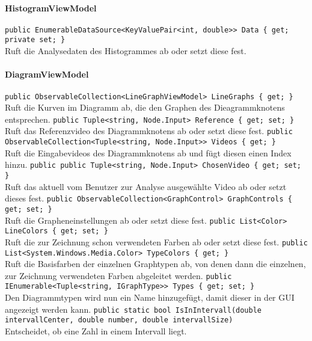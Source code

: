 \paragraph{HistogramViewModel}
\begin{itemize}
	\add \verb!public EnumerableDataSource<KeyValuePair<int, double>> Data { get; private set; }! \\
	Ruft die Analysedaten des Histogrammes ab oder setzt diese fest.
\end{itemize}

\paragraph{DiagramViewModel}
\begin{itemize}
	\add \verb!public ObservableCollection<LineGraphViewModel> LineGraphs { get; }! \\
	Ruft die Kurven im Diagramm ab, die den Graphen des Dieagrammknotens entsprechen. 
	\add \verb!public Tuple<string, Node.Input> Reference { get; set; }! \\
	Ruft das Referenzvideo des Diagrammknotens ab oder setzt diese fest.
	\add \verb!public ObservableCollection<Tuple<string, Node.Input>> Videos { get; }! \\
	Ruft die Eingabevideos des Diagrammknotens ab und fügt diesen einen Index hinzu.
	\add \verb!public public Tuple<string, Node.Input> ChosenVideo { get; set; }! \\
	Ruft das aktuell vom Benutzer zur Analyse ausgewählte Video ab oder setzt dieses fest.
	\add \verb!public ObservableCollection<GraphControl> GraphControls { get; set; }! \\
	Ruft die Grapheneinstellungen ab oder setzt diese fest.
	\add \verb!public List<Color> LineColors { get; set; }! \\
	Ruft die zur Zeichnung schon verwendeten Farben ab oder setzt diese fest.
	\add \verb!public List<System.Windows.Media.Color> TypeColors { get; }! \\
	Ruft die Basisfarben der einzelnen Graphtypen ab, von denen dann die einzelnen, zur Zeichnung verwendeten Farben abgeleitet werden.
	\change \verb!public IEnumerable<Tuple<string, IGraphType>> Types { get; set; }! \\
	Den Diagrammtypen wird nun ein Name hinzugefügt, damit dieser in der GUI angezeigt werden kann.
	\add \verb!public static bool IsInIntervall(double intervallCenter, double number, double intervallSize)! \\
	Entscheidet, ob eine Zahl in einem Intervall liegt.

\end{itemize}

